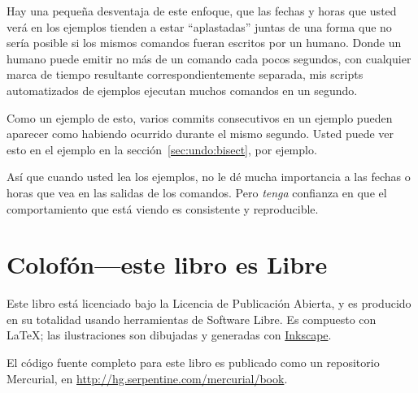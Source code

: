 Hay una pequeña desventaja de este enfoque, que las fechas y horas que
usted verá en los ejemplos tienden a estar ``aplastadas'' juntas de una
forma que no sería posible si los mismos comandos fueran escritos por
un humano. Donde un humano puede emitir no más de un comando cada
pocos segundos, con cualquier marca de tiempo resultante
correspondientemente separada, mis scripts automatizados de ejemplos
ejecutan muchos comandos en un segundo.

Como un ejemplo de esto, varios commits consecutivos en un ejemplo
pueden aparecer como habiendo ocurrido durante el mismo segundo. Usted
puede ver esto en el ejemplo  en la
sección~\ref{sec:undo:bisect}, por ejemplo.

Así que cuando usted lea los ejemplos, no le dé mucha importancia a
las fechas o horas que vea en las salidas de los comandos. Pero
\emph{tenga} confianza en que el comportamiento que está viendo es
consistente y reproducible.

\section{Colofón---este libro es Libre}
Este libro está licenciado bajo la Licencia de Publicación Abierta, y
es producido en su totalidad usando herramientas de Software Libre. Es
compuesto con \LaTeX{}; las ilustraciones son dibujadas y generadas
con \href{http://www.inkscape.org/}{Inkscape}.

El código fuente completo para este libro es publicado como un
repositorio Mercurial, en \url{http://hg.serpentine.com/mercurial/book}.


